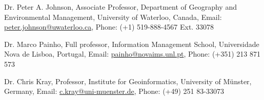 


\begin{cventries}

  \cventry
    {} %
    {} %
    {} %
    {} %
    {\begin{cvitems} %
        \item {Dr. Peter A. Johnson, Associate Professor, Department of Geography and Environmental Management, University of Waterloo, Canada, Email: \url{peter.johnson@uwaterloo.ca}, Phone: (+1) 519-888-4567 Ext. 33078}
      \end{cvitems}}

  \cventry
    {} %
    {} %
    {} %
    {} %
    {\begin{cvitems} %
        \item {Dr. Marco Painho, Full professor, Information Management School, Universidade Nova de Lisboa, Portugal, Email: \url{painho@novaims.unl.pt}, Phone: (+351) 213 871 573}
      \end{cvitems}}
      
  \cventry
    {} %
    {} %
    {} %
    {} %
    {\begin{cvitems} %
        \item {Dr. Chris Kray, Professor, Institute for Geoinformatics, University of Münster, Germany, Email: \url{c.kray@uni-muenster.de}, Phone: (+49) 251 83-33073}
      \end{cvitems}}

\end{cventries}
